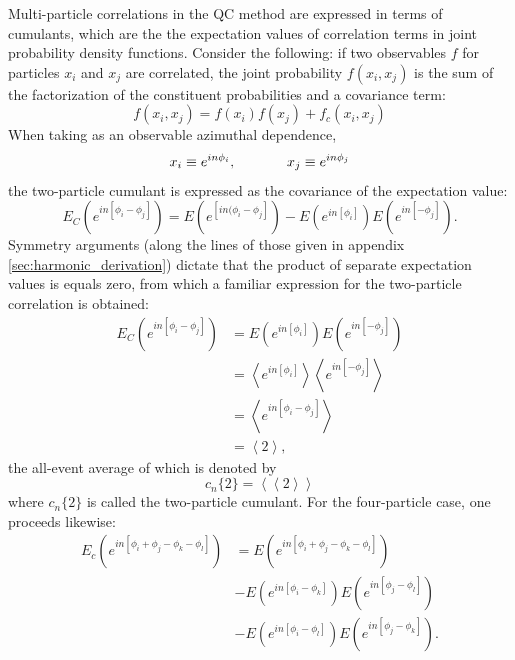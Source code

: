 \documentclass[a4paper]{book}
\numberwithin{equation}{subsection}
\begin{document}
	Multi-particle correlations in the QC method are expressed in terms of cumulants, which are the the expectation values of correlation terms in joint probability density functions. Consider the following: if two observables $f$ for particles $x_i$ and $x_j$ are correlated, the joint probability $f(x_i, x_j)$ is the sum of the factorization of the constituent probabilities and a covariance term:
	\begin{equation}
		f(x_i, x_j) = f(x_i)f(x_j) + f_c (x_i, x_j)
	\end{equation}
	When taking as an observable azimuthal dependence,
	\begin{align}
		x_i \equiv e^{i n \phi_i}, \hspace{.5in} x_j \equiv e^{i n \phi_j} 
	\end{align}
	the two-particle cumulant is expressed as the covariance of the expectation value:
	\begin{equation}
		E_C(e^{i n[\phi_i - \phi_j]}) = E(e^{[i n(\phi_i - \phi_j]}) - E(e^{in[\phi_i]})E(e^{in[- \phi_j]}).
	\end{equation}
	Symmetry arguments (along the lines of those given in appendix \ref{sec:harmonic_derivation}) dictate that the product of separate expectation values is equals zero, from which a familiar expression for the two-particle correlation is obtained:
	\begin{align}
		E_C(e^{i n[\phi_i - \phi_j]}) & = E(e^{in[\phi_i]})E(e^{in[- \phi_j]})                                   \\
		                              & = \left< e^{in[\phi_i]}\right> \left< e^{in[- \phi_j]} \right> \nonumber \\
		                              & = \left< e^{in[\phi_i - \phi_j]} \right> \nonumber                       \\
		                              & = \left< 2 \right>, \nonumber                                            
	\end{align}
	the all-event average of which is denoted by
	\begin{equation}\label{twocul}
		c_n\{2\} = \left< \left< 2 \right> \right>
	\end{equation}
	where $c_n\{2\}$ is called the two-particle cumulant. For the four-particle case, one proceeds likewise:
	\begin{align}
		E_c(e^{in[\phi_i + \phi_j - \phi_k -\phi_l]}) & = E(e^{in[\phi_i + \phi_j - \phi_k -\phi_l]})                     \\
		                                              & - E(e^{in[\phi_i - \phi_k]})E(e^{in[\phi_j - \phi_l]})\nonumber   \\
		                                              & - E(e^{in[\phi_i - \phi_l]})E(e^{in[\phi_j - \phi_k]}). \nonumber 
	\end{align}
\end{document}
